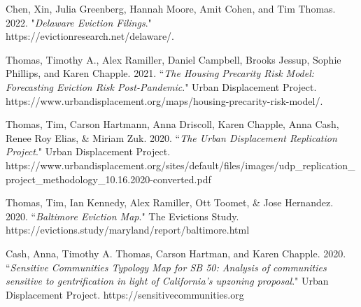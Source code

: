 \begin{cvparagraph}

Chen, Xin, Julia Greenberg, Hannah Moore, Amit Cohen, and Tim Thomas. 2022. "\emph{Delaware Eviction Filings}."\\
https://evictionresearch.net/delaware/. 
\end{cvparagraph}

\begin{cvparagraph}

Thomas, Timothy A., Alex Ramiller, Daniel Campbell, Brooks Jessup, Sophie Phillips, and Karen Chapple. 2021. “\emph{The Housing Precarity Risk Model: Forecasting Eviction Risk Post-Pandemic}." Urban Displacement Project. https://www.urbandisplacement.org/maps/housing-precarity-risk-model/.
\end{cvparagraph}

\begin{cvparagraph}

Thomas, Tim, Carson Hartmann, Anna Driscoll, Karen Chapple, Anna Cash, Renee Roy Elias, \& Miriam Zuk. 2020. “\emph{The Urban Displacement Replication Project}." Urban Displacement Project.\\
https://www.urbandisplacement.org/sites/default/files/images/udp\_replication\_project\_methodology\_10.16.2020-converted.pdf
\end{cvparagraph}

\begin{cvparagraph}

Thomas, Tim, Ian Kennedy, Alex Ramiller, Ott Toomet, \& Jose Hernandez. 2020. “\emph{Baltimore Eviction Map}." The Evictions Study.\\
https://evictions.study/maryland/report/baltimore.html
\end{cvparagraph}

\begin{cvparagraph}

Cash, Anna, Timothy A. Thomas, Carson Hartman, and Karen Chapple. 2020. “\emph{Sensitive Communities Typology Map for SB 50: Analysis of communities sensitive to gentrification in light of California's upzoning proposal}." Urban Displacement Project. https://sensitivecommunities.org
\end{cvparagraph}

